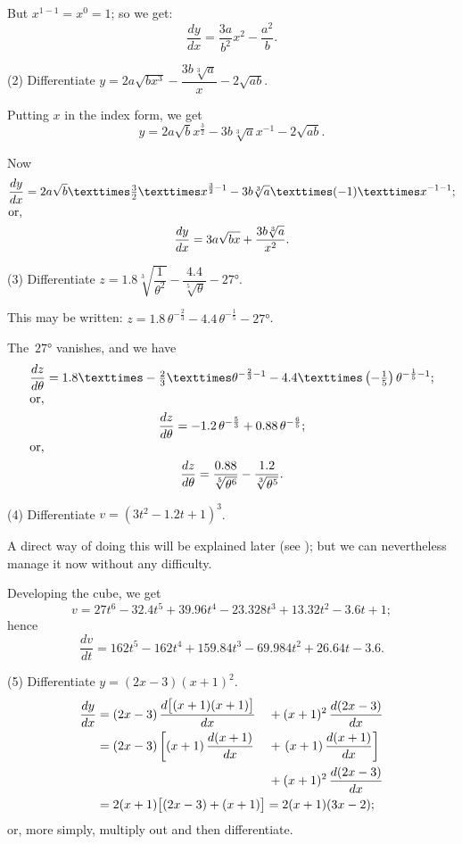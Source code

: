 \documentclass[12pt]{book}[2005/09/16]
\newcommand{\DPPageSep}[2]{\Pagelabel{#2}}
\newcommand{\Pagelabel}[1]
  {\phantomsection\label{#1}}
\newcommand{\Pageref}[2][p.]{%
  \ifthenelse{\not\equal{#1}{}}{%
    \hyperref[#2]{#1~\pageref{#2}}%
  }{%
    \hyperref[#2]{\pageref{#2}}%
  }%
}
\newcommand{\efrac}[2]{\frac{#1}{#2}}
\begin{document}
But $x^{1-1} = x^0 = 1$; so we get:
\[
\frac{dy}{dx} = \frac{3a}{b^2} x^2 - \frac{a^2}{b}.
\]

(2) Differentiate $y = 2a\sqrt{bx^3} - \dfrac{3b \sqrt[3]{a}}{x} - 2\sqrt{ab}$.

Putting $x$ in the index form, we get
\[
y = 2a\sqrt{b} x^{\efrac{3}{2}} - 3b \sqrt[3]{a} x^{-1} - 2\sqrt{ab}.
\]

Now
\begin{gather*}
\frac{dy}{dx} = 2a\sqrt{b} × \tfrac{3}{2} × x^{\efrac{3}{2}-1} - 3b\sqrt[3]{a} × (-1) × x^{-1-1}; \\
\intertext{or,}
\frac{dy}{dx} = 3a\sqrt{bx} + \frac{3b\sqrt[3]{a}}{x^2}.
\end{gather*}
\DPPageSep{054.png}{42}%

(3) Differentiate $z = 1.8 \sqrt[3]{\dfrac{1}{\theta^2}} - \dfrac{4.4}{\sqrt[5]{\theta}} - 27°$.

This may be written: $z= 1.8\, \theta^{-\efrac{2}{3}} - 4.4\, \theta^{-\efrac{1}{5}} - 27°$.

The~$27°$ vanishes, and we have
\begin{gather*}
\frac{dz}{d\theta}
  = 1.8 × -\tfrac{2}{3} × \theta^{-\efrac{2}{3}-1}
  - 4.4 × \left(-\tfrac{1}{5}\right)\theta^{-\efrac{1}{5}-1}; \\
\intertext{or,}
\frac{dz}{d\theta}
  = -1.2\, \theta^{-\efrac{5}{3}} + 0.88\, \theta^{-\efrac{6}{5}}; \\
\intertext{or,}
\frac{dz}{d\theta} = \frac{0.88}{\sqrt[5]{\theta^6}}
  - \frac{1.2}{\sqrt[3]{\theta^5}}.
\end{gather*}

(4) Differentiate $v = (3t^2 - 1.2 t + 1)^3$.

A direct way of doing this will be explained later
(see \Pageref{dodge}); but we can nevertheless manage it now
without any difficulty.

Developing the cube, we get
\[
v = 27t^6 - 32.4t^5 + 39.96t^4 - 23.328t^3 + 13.32t^2 - 3.6t + 1; %
\]
hence
\[
\frac{dv}{dt} = 162t^5 - 162t^4 + 159.84t^3 - 69.984t^2 + 26.64t - 3.6.
\]

(5) Differentiate $y = (2x - 3)(x + 1)^2$.
\begin{alignat*}{2}
\frac{dy}{dx}
  &= (2x - 3)\, \frac{d\bigl[(x + 1)(x + 1)\bigr]}{dx}
     &&+ (x + 1)^2\, \frac{d(2x - 3)}{dx} \\
  &= (2x - 3) \left[(x + 1)\, \frac{d(x + 1)}{dx}\right.
     &&+ \left.(x + 1)\, \frac{d(x + 1)}{dx}\right] \\
  &  &&+ (x + 1)^2\, \frac{d(2x - 3)}{dx} \\
  &= \rlap{$2(x + 1)\bigl[(2x - 3) + (x + 1)\bigr] = 2(x + 1)(3x - 2)$;}&&
\end{alignat*}
or, more simply, multiply out and then differentiate.
\DPPageSep{055.png}{43}%
\end{document}
